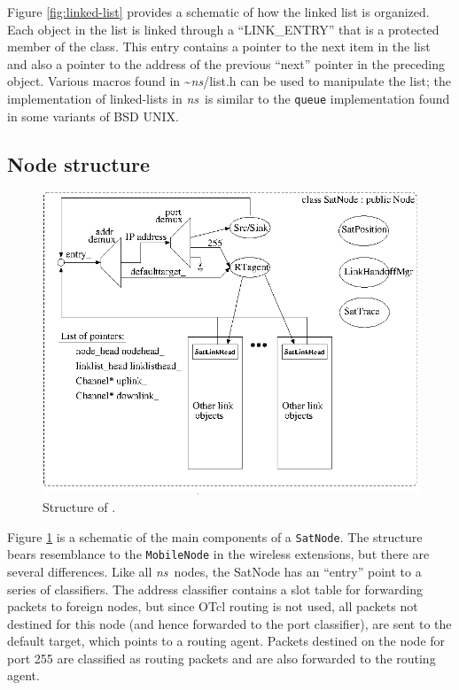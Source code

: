 Figure \ref{fig:linked-list} provides a schematic of how the linked list
is organized.  Each object in the list is linked through a ``LINK\_ENTRY''
that is a protected member of the class.  This entry contains a pointer
to the next item in the list and also a pointer to the address of the
previous ``next'' pointer in the preceding object.   Various macros
found in \textasciitilde\emph{ns}/{list.h} can be used to manipulate the list; the 
implementation of linked-lists in \emph{ns}~is similar to the {\tt queue} 
implementation found in some variants of BSD UNIX.

\subsection{Node structure}

\begin{figure}
    \centerline{\includegraphics{sat-node}}
    \caption{Structure of .}
    \label{fig:sat-node}
\end{figure}

Figure \ref{fig:sat-node} is a schematic of the main components of a
{\tt SatNode}.  The structure bears resemblance to the {\tt MobileNode}
in the wireless extensions, but there are several differences.  Like all
\emph{ns}~nodes, the SatNode has an ``entry'' point to a series of classifiers.
The address classifier contains a slot table for forwarding packets to 
foreign nodes, but since OTcl routing is not used, all packets not destined
for this node (and hence forwarded to the port classifier), are sent to
the default target, which points to a routing agent.  Packets destined
on the node for port 255 are classified as routing packets and are also
forwarded to the routing agent.

